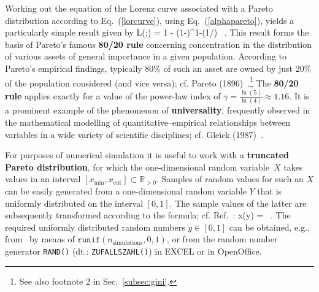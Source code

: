 \medskip
\noindent
Working out the equation of the Lorenz curve associated with a 
Pareto distribution according to Eq.~(\ref{lorcurve}), using
Eq.~(\ref{alphapareto}), yields a particularly simple result
given by
%
\be
L(\alpha;\gamma) = 1 - (1-\alpha)^{1-(1/\gamma)} \ .
\ee
%
This result forms the basis of Pareto's famous \textbf{80/20 rule} 
concerning concentration in the distribution of various assets of 
general importance in a given population. According to Pareto's 
empirical findings, typically 80\% of such an asset are owned by 
just 20\% of the population considered (and vice versa); cf. 
Pareto (1896)~.\footnote{See also footnote 2 in 
Sec.~\ref{subsec:gini}.} The \textbf{80/20 rule} applies exactly
for a value of the power-law index of ${\displaystyle\gamma = 
\frac{\ln(5)}{\ln(4)}} \approx 1.16$. It is a prominent example of 
the phenomenon of \textbf{universality}, frequently observed in the 
mathematical modelling of quantitative--empirical relationships 
between variables in a wide variety of scientific disciplines; cf. 
Gleick (1987)~.

\medskip
\noindent
For purposes of numerical simulation it is useful to work with a 
\textbf{truncated Pareto distribution}, for which the
one-dimensional random variable~$X$ takes values in an interval
$\left[x_\mathrm{min},x_\mathrm{cut}\right] \subset
\mathbb{R}_{>0}$. Samples of 
random values for such an $X$ can be easily generated from a 
one-dimensional random variable $Y$ that is uniformly distributed 
on the interval $\left[0,1\right]$. The sample values of the latter
are subsequently transformed according to the formula; cf. 
Ref.~:
%
\be
x(y) =  \ .
\ee
%
The required uniformly distributed random numbers $y \in 
\left[0,1\right]$ can be obtained, e.g., from \R\ by means of
$\texttt{runif}(n_{\mathrm{simulations}},0,1)$, or from the random
number generator \texttt{RAND()} (dt.: \texttt{ZUFALLSZAHL()})
in EXCEL or in OpenOffice.

